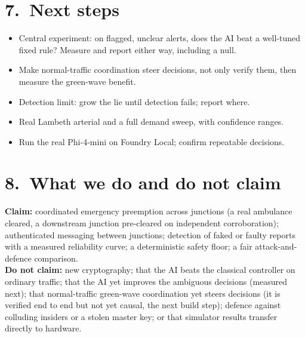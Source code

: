 \documentclass[11pt]{article}
\begin{document}
\vspace{2pt}
\begin{minipage}[t]{0.48\textwidth}
\section{7.\ Next steps}
\vspace{2pt}
\begin{itemize}
\item Central experiment: on flagged, unclear alerts, does the AI beat a well-tuned fixed rule? Measure and report either way, including a null.
\item Make normal-traffic coordination steer decisions, not only verify them, then measure the green-wave benefit.
\item Detection limit: grow the lie until detection fails; report where.
\item Real Lambeth arterial and a full demand sweep, with confidence ranges.
\item Run the real Phi-4-mini on Foundry Local; confirm repeatable decisions.
\end{itemize}
\end{minipage}\hfill
\begin{minipage}[t]{0.48\textwidth}
\section{8.\ What we do and do not claim}
\vspace{2pt}
{\footnotesize \textbf{Claim:} coordinated emergency preemption across junctions (a real ambulance cleared, a downstream junction pre-cleared on independent corroboration); authenticated messaging between junctions; detection of faked or faulty reports with a measured reliability curve; a deterministic safety floor; a fair attack-and-defence comparison.\\[3pt]
\textbf{Do not claim:} new cryptography; that the AI beats the classical controller on ordinary traffic; that the AI yet improves the ambiguous decisions (measured next); that normal-traffic green-wave coordination yet steers decisions (it is verified end to end but not yet causal, the next build step); defence against colluding insiders or a stolen master key; or that simulator results transfer directly to hardware.}
\end{minipage}
\end{document}
